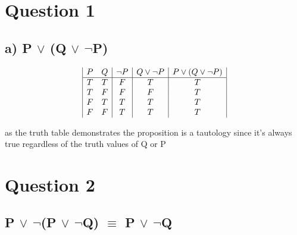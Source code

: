 \documentclass[a4paper]{article}
\begin{document}
\section*{Question 1}
\subsection*{a) P $\lor$ (Q $\lor$ $\neg$P)}

\begin{displaymath}
    \begin{array}{|c c| c | c | c |}
        P & Q & \neg P & Q \lor \neg P & P \lor (Q \lor \neg P)\\
        \hline
        T & T & F & T & T\\
        T & F & F & F & T\\
        F & T & T & T & T\\
        F & F & T & T & T\\
    \end{array}
\end{displaymath}

as the truth table demonstrates the proposition is a tautology since
it's always true regardless of the truth values of Q or P

\section*{Question 2}
\subsection*{P $\lor$ $\neg$(P $\lor$ $\neg$Q) $\equiv$ P $\lor$ $\neg$Q}
\end{document}
